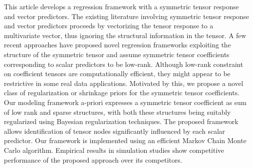 
This article develops a regression framework with a symmetric tensor response and vector predictors. The existing literature involving symmetric tensor response and vector predictors proceeds by vectorizing the tensor response to a multivariate vector, thus ignoring the structural information in the tensor. A few recent approaches have proposed novel regression frameworks exploiting the structure of the symmetric tensor and assume symmetric tensor coefficients corresponding to scalar predictors to be low-rank. Although low-rank constraint on coefficient tensors are computationally efficient, they might appear to be restrictive in some real data applications.  Motivated by this, we propose a novel class of regularization or shrinkage priors for the symmetric tensor coefficients. Our modeling framework a-priori expresses a symmetric tensor coefficient as sum of low rank and sparse structures, with both these structures being suitably regularized using Bayesian regularization techniques. The proposed framework allows identification of tensor nodes significantly influenced by each scalar predictor. Our framework is implemented using an efficient Markov Chain Monte Carlo algorithm. Empirical results in simulation studies show competitive performance of the proposed approach over its competitors.


